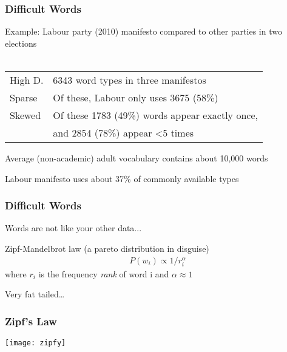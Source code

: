 \documentclass[11pt,compress,professionalfonts]{beamer}
\begin{document}
\begin{frame}[t,fragile]\frametitle{Difficult Words}

Example: Labour party (2010) manifesto compared to other parties in two elections\\
~\\
\begin{tabular}{ll}
High D. & 6343 word types in three manifestos \\
Sparse & Of these, Labour only uses 3675 (58\%)\\
Skewed &  Of these 1783 (49\%) words appear exactly once,\\
&  and 2854 (78\%) appear <5 times
\end{tabular}

Average (non-academic) adult vocabulary contains about 10,000 words

Labour manifesto uses about 37\% of commonly available types



\end{frame}
\begin{frame}[t,fragile]\frametitle{Difficult Words}

Words are not like your other data...

Zipf-Mandelbrot law (a pareto distribution in disguise)
\begin{align*}
P(w_i) \propto 1/{r_i^\alpha}
\end{align*}
where $r_i$ is the frequency \textsl{rank} of word i and $\alpha\approx 1$

Very fat tailed\ldots

\end{frame}
\begin{frame}[t,fragile]\frametitle{Zipf's Law}

\begin{center}
\texttt{[image: zipfy]}
\end{center}


\end{frame}
\end{document}
